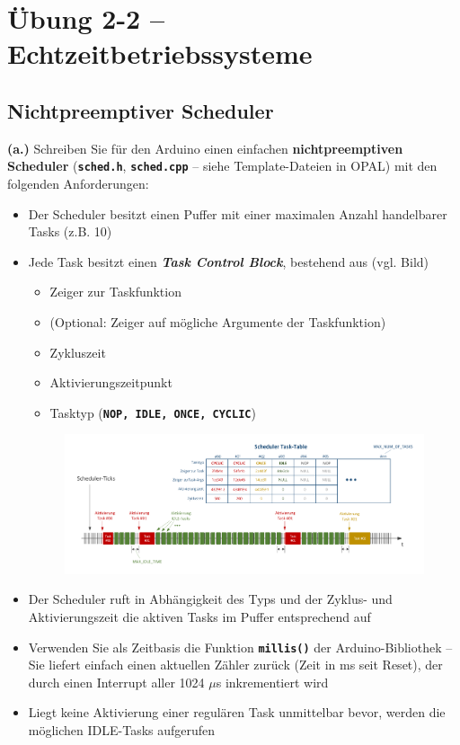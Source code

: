 \documentclass[
    fontsize=12pt,                      %
    paper=a4,                           %
    twoside=off,                       %
    DIV=15,                             %
    BCOR=12mm,                          %
    headings=normal,                    %
    headsepline=false,                   %
    footsepline=false,                  %
    headinclude=true,                   %
    footinclude=false,                  %
    toc=listof,                         %
    toc=bib,                            %
    chapterprefix=false,                %
    appendixprefix=false,               %
    numbers=noendperiod,                %
    captions=tableabove,                %
    footnotes=multiple,                 %
    bibliography=oldstyle,              %
    draft=false,                        %
]{scrreprt}
\newcommand{\Farbcode}[1]{\texttt{\textbf{\textcolor{myred}{#1}}}}
\begin{document}
\chapter*{Übung 2-2 -- Echtzeitbetriebssysteme}

\section*{Nichtpreemptiver Scheduler}
\textbf{(a.)}
\vskip 0.2cm
\noindent
Schreiben Sie für den Arduino einen einfachen \textbf{nichtpreemptiven Scheduler} (\Farbcode{sched.h}, \Farbcode{sched.cpp} -- siehe Template-Dateien in OPAL) mit den folgenden Anforderungen:
\begin{itemize}
\item Der Scheduler besitzt einen Puffer mit einer maximalen Anzahl handelbarer Tasks (z.B. 10) 
\item Jede Task besitzt einen \textbf{\emph{Task Control Block}}, bestehend aus (vgl. Bild)
\begin{itemize}
\item Zeiger zur Taskfunktion
\item (Optional: Zeiger auf mögliche Argumente der Taskfunktion)
\item Zykluszeit
\item Aktivierungszeitpunkt
\item Tasktyp (\Farbcode{NOP, IDLE, ONCE, CYCLIC})
\end{itemize}

\begin{figure}[H]
	\centering
	\includegraphics[width=\textwidth]{Figures/Scheduler}
\end{figure}

\item Der Scheduler ruft in Abhängigkeit des Typs und der Zyklus- und Aktivierungszeit die aktiven Tasks im Puffer entsprechend auf  
\item Verwenden Sie als Zeitbasis die Funktion \Farbcode{millis()} der Arduino-Bibliothek -- Sie liefert einfach einen aktuellen Zähler zurück (Zeit in ms seit Reset), der durch einen Interrupt aller 1024 $\mu$s inkrementiert wird
\item Liegt keine Aktivierung einer regulären Task unmittelbar bevor, werden die möglichen IDLE-Tasks aufgerufen


\end{itemize}
\end{document}

